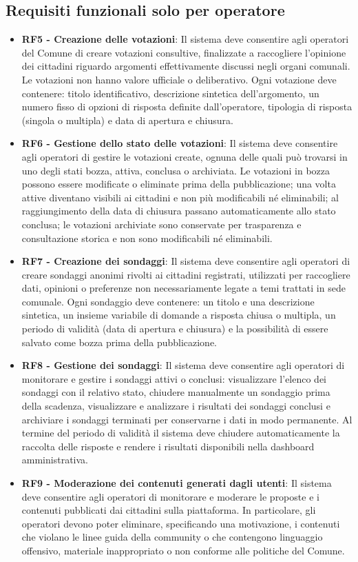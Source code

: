 \documentclass{article}
\begin{document}
\subsection{Requisiti funzionali solo per operatore}
\begin{itemize}
	\item \textbf{RF5 - Creazione delle votazioni}: Il sistema deve consentire agli operatori del Comune di creare votazioni consultive, finalizzate a raccogliere l'opinione dei cittadini riguardo argomenti effettivamente discussi negli organi comunali. Le votazioni non hanno valore ufficiale o deliberativo. Ogni votazione deve contenere: titolo identificativo, descrizione sintetica dell'argomento, un numero fisso di opzioni di risposta definite dall'operatore, tipologia di risposta (singola o multipla) e data di apertura e chiusura.
	\item \textbf{RF6 - Gestione dello stato delle votazioni}: Il sistema deve consentire agli operatori di gestire le votazioni create, ognuna delle quali può trovarsi in uno degli stati bozza, attiva, conclusa o archiviata. Le votazioni in bozza possono essere modificate o eliminate prima della pubblicazione; una volta attive diventano visibili ai cittadini e non più modificabili né eliminabili; al raggiungimento della data di chiusura passano automaticamente allo stato conclusa; le votazioni archiviate sono conservate per trasparenza e consultazione storica e non sono modificabili né eliminabili.
	\item \textbf{RF7 - Creazione dei sondaggi}: Il sistema deve consentire agli operatori di creare sondaggi anonimi rivolti ai cittadini registrati, utilizzati per raccogliere dati, opinioni o preferenze non necessariamente legate a temi trattati in sede comunale. Ogni sondaggio deve contenere: un titolo e una descrizione sintetica, un insieme variabile di domande a risposta chiusa o multipla, un periodo di validità (data di apertura e chiusura) e la possibilità di essere salvato come bozza prima della pubblicazione.
	\item \textbf{RF8 - Gestione dei sondaggi}: Il sistema deve consentire agli operatori di monitorare e gestire i sondaggi attivi o conclusi: visualizzare l'elenco dei sondaggi con il relativo stato, chiudere manualmente un sondaggio prima della scadenza, visualizzare e analizzare i risultati dei sondaggi conclusi e archiviare i sondaggi terminati per conservarne i dati in modo permanente. Al termine del periodo di validità il sistema deve chiudere automaticamente la raccolta delle risposte e rendere i risultati disponibili nella dashboard amministrativa.
	\item \textbf{RF9 - Moderazione dei contenuti generati dagli utenti}: Il sistema deve consentire agli operatori di monitorare e moderare le proposte e i contenuti pubblicati dai cittadini sulla piattaforma. In particolare, gli operatori devono poter eliminare, specificando una motivazione, i contenuti che violano le linee guida della community o che contengono linguaggio offensivo, materiale inappropriato o non conforme alle politiche del Comune.
\end{itemize}
\end{document}
